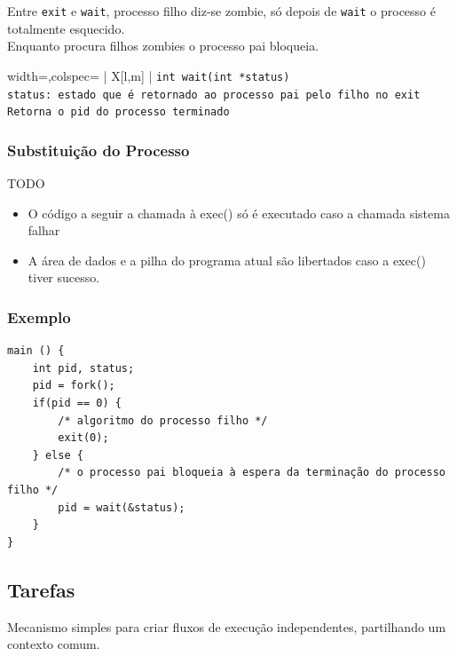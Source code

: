 \documentclass[11pt]{article}
\begin{document}
Entre \lstinline|exit| e \lstinline|wait|, processo filho diz-se zombie, só depois de \lstinline|wait| o processo é totalmente esquecido. \\
Enquanto procura filhos zombies o processo pai bloqueia.

\begin{tblr}{width=\linewidth,colspec={ | X[l,m] | }}
    \hline
    \lstinline|int wait(int *status)|                                             \\\hline
    \lstinline|status: estado que é retornado ao processo pai pelo filho no exit| \\\hline
    \lstinline|Retorna o pid do processo terminado|                               \\\hline
\end{tblr}

\subsubsection{Substituição do Processo}

TODO

\begin{itemize}
    \item O código a seguir a chamada à exec() só é executado caso a chamada sistema falhar
    \item A área de dados e a pilha do programa atual são libertados caso a exec() tiver sucesso.
\end{itemize}

\subsubsection{Exemplo}

\begin{lstlisting}
main () {
    int pid, status;
    pid = fork();
    if(pid == 0) {
        /* algoritmo do processo filho */
        exit(0);
    } else {
        /* o processo pai bloqueia à espera da terminação do processo filho */
        pid = wait(&status);
    }
}
\end{lstlisting}

\newpage

\subsection{Tarefas}

Mecanismo simples para criar fluxos de execução independentes, partilhando um contexto comum.
\end{document}
